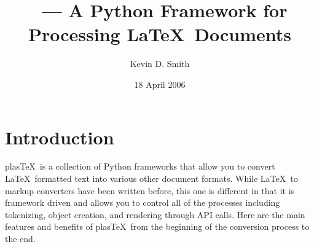 \documentclass{manual}
\title{\plasTeX\ --- A Python Framework for Processing \LaTeX\ Documents}
\author{Kevin D. Smith}
\date{18 April 2006}
\newcommand{\plasTeX}{plas\TeX}
\begin{document}
\maketitle
\tableofcontents

\chapter{Introduction}

\plasTeX\ is a collection of Python frameworks that allow you to convert
\LaTeX\ formatted text into various other document formats.  While \LaTeX\ to
markup converters have been written before, this one is different in 
that it is framework driven and allows you to control all of the 
processes including tokenizing, object creation, and rendering through 
API calls.  Here are the main features and benefits of \plasTeX\ from
the beginning of the conversion process to the end.
\end{document}
